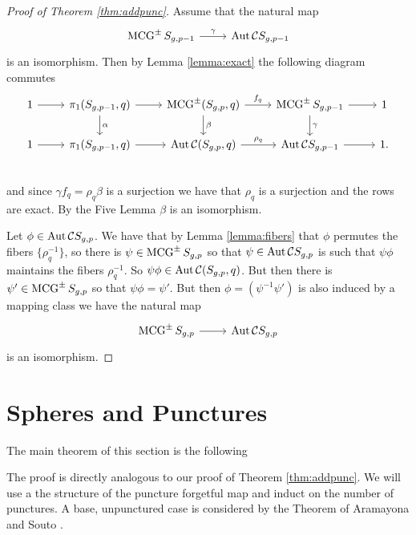 \begin{proof}[Proof of Theorem \ref{thm:addpunc}]
  Assume that the natural map
  $$
  \begin{tikzcd}
  \mcg^{\pm}S_{g,p-1} \arrow{r}{\gamma}& \aaut \mathcal C S_{g,p-1}
  \end{tikzcd}
  $$
  is an isomorphism.
  Then by Lemma
  \ref{lemma:exact}
  the following diagram commutes
  $$
  \begin{tikzcd}
  1 \arrow[r]&
  \pi_1(S_{g,p-1},q) \arrow[r] \arrow{d}{\alpha}&
  \mcg^{\pm}(S_{g,p},q)  \arrow{r}{f_q} \arrow{d}{\beta}&
  \mcg^{\pm}S_{g,p-1} \arrow[r] \arrow{d}{\gamma}&
  1 \\
  1 \arrow[r]&
  \pi_1(S_{g,p-1},q) \arrow{r}&
  \aaut \mathcal C (S_{g,p},q)  \arrow{r}{\rho_q}&
  \aaut \mathcal C S_{g,p-1} \arrow{r}&
  1. \\
  \end{tikzcd}
  $$
  and since $\gamma f_q = \rho_q \beta$ is a surjection we have
  that $\rho_q$ is a surjection and the rows are exact.
  By the Five Lemma $\beta$ is an isomorphism.

  Let $\phi \in \operatorname{Aut} \mathcal C S_{g,p}$.
  We have that by Lemma
  \ref{lemma:fibers} that
  $\phi$ permutes the fibers $\{\rho^{-1}_q\}$,
  so there is $\psi \in \operatorname{MCG}^{\pm}S_{g,p}$
  so that $\psi \in \operatorname{Aut} \mathcal C S_{g,p}$
  is such that $\psi \phi$ maintains the fibers
  $\rho^{-1}_q$.
  So $\psi \phi \in \operatorname{Aut} \mathcal C(S_{g,p},q)$.
  But then there is $\psi' \in \operatorname{MCG}^{\pm}S_{g,p}$
  so that $\psi \phi = \psi'$.
  But then $\phi = \left ( \psi^{-1}\psi' \right)$
  is also induced by a mapping class we have the natural map
  $$
  \begin{tikzcd}
  \mcg^{\pm}S_{g,p} \arrow{r} & \aaut \mathcal C S_{g,p}
  \end{tikzcd}
  $$
  is an isomorphism.
\end{proof}


\section{Spheres and Punctures}
\label{sect:spherepunc}

The main theorem of this section is the following


\outpunc*

The proof is directly analogous to our proof of Theorem
\ref{thm:addpunc}.
We will use a the structure of the puncture forgetful map and induct on the number of punctures.
A base, unpunctured case is considered by the Theorem of Aramayona and Souto \cite{souto}.

